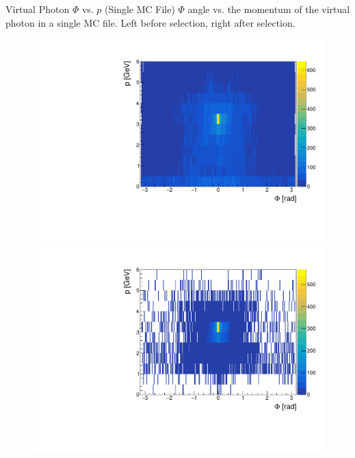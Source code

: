 \documentclass[10pt]{beamer}
\begin{document}
\begin{frame}{Virtual Photon $\Phi$ vs. $p$ (Single MC File)}
	$\Phi$ angle vs. the momentum of the virtual photon in a single MC file. Left before selection, right after selection.
	
	\begin{figure}
		\centering
		\begin{minipage}{.5\textwidth}
			\centering
			\includegraphics[width=\textwidth]{gg/PhiMgg_BS}
			
		\end{minipage}%
		\begin{minipage}{.5\textwidth}
			\centering
			\includegraphics[width=\textwidth]{gg/PhiMgg_AS}
			
		\end{minipage}
	\end{figure}
\end{frame}
\end{document}
